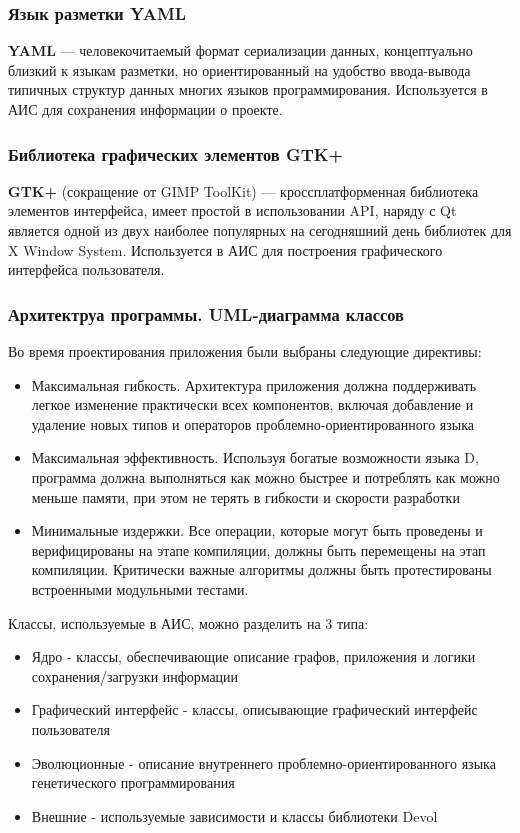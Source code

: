 \documentclass[russian,utf8,emptystyle]{eskdtext}
\begin{document}
\subsubsection{Язык разметки YAML}
\textbf{YAML} — человекочитаемый формат сериализации данных, концептуально близкий к языкам разметки, но ориентированный на удобство ввода-вывода типичных структур данных многих языков программирования. Используется в АИС для сохранения информации о проекте.

\subsubsection{Библиотека графических элементов GTK+}
\textbf{GTK+} (сокращение от GIMP ToolKit) — кроссплатформенная библиотека элементов интерфейса, имеет простой в использовании API, наряду с Qt является одной из двух наиболее популярных на сегодняшний день библиотек для X Window System. Используется в АИС для построения графического интерфейса пользователя.

\subsubsection{Архитектруа программы. UML-диаграмма классов}
Во время проектирования приложения были выбраны следующие директивы:
\begin{itemize}
\item Максимальная гибкость. Архитектура приложения должна поддерживать легкое изменение практически всех компонентов, включая добавление и удаление новых типов и операторов проблемно-ориентированного языка
\item Максимальная эффективность. Используя богатые возможности языка D, программа должна выполняться как можно быстрее и потреблять как можно меньше памяти, при этом не терять в гибкости и скорости разработки
\item Минимальные издержки. Все операции, которые могут быть проведены и верифицированы на этапе компиляции, должны быть перемещены на этап компиляции. Критически важные алгоритмы должны быть протестированы встроенными модульными тестами.
\end{itemize}

Классы, используемые в АИС, можно разделить на 3 типа:
\begin{itemize}
\item Ядро - классы, обеспечивающие описание графов, приложения и логики сохранения/загрузки информации
\item Графический интерфейс - классы, описывающие графический интерфейс пользователя
\item Эволюционные - описание внутреннего проблемно-ориентированного языка генетического программирования
\item Внешние - используемые зависимости и классы библиотеки Devol
\end{itemize}
\end{document}
